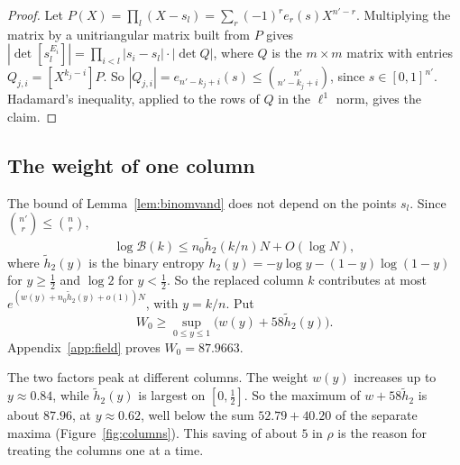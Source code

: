 \documentclass[11pt]{amsart}
\newcommand{\WZero}{87.9663}
\theoremstyle{definition}
\theoremstyle{remark}
\numberwithin{equation}{section}
\begin{document}
\begin{proof}
Let $P(X)=\prod_l(X-s_l)=\sum_r(-1)^re_r(s)X^{n'-r}$. Multiplying the matrix by a unitriangular matrix built
from $P$ gives $|\det[s_l^{E_i}]|=\prod_{i<l}|s_i-s_l|\cdot|\det Q|$, where $Q$ is the $m\times m$ matrix with
entries $Q_{j,i}=[X^{k_j-i}]P$. So $|Q_{j,i}|=e_{n'-k_j+i}(s)\le\binom{n'}{n'-k_j+i}$, since $s\in[0,1]^{n'}$.
Hadamard's inequality, applied to the rows of $Q$ in the $\ell^1$ norm, gives the claim.
\end{proof}

\subsection{The weight of one column}\label{ssec:weights}
The bound of Lemma~\ref{lem:binomvand} does not depend on the points $s_l$. Since $\binom{n'}r\le\binom nr$,
\[
 \log\mathcal B(k)\le n_0\tilde h_2(k/n)N+O(\log N),
\]
where $\tilde h_2(y)$ is the binary entropy $h_2(y)=-y\log y-(1-y)\log(1-y)$ for $y\ge\frac12$ and $\log2$ for
$y<\frac12$. So the replaced column $k$ contributes at most $e^{(w(y)+n_0\tilde h_2(y)+o(1))N}$, with $y=k/n$.
Put
\[
 W_0\ge\sup_{0\le y\le1}\bigl(w(y)+58\tilde h_2(y)\bigr).
\]
Appendix~\ref{app:field} proves $W_0=\WZero$.

The two factors peak at different columns. The weight $w(y)$ increases up to $y\approx0.84$, while
$\tilde h_2(y)$ is largest on $[0,\frac12]$. So the maximum of $w+58\tilde h_2$ is about $87.96$, at
$y\approx0.62$, well below the sum $52.79+40.20$ of the separate maxima (Figure~\ref{fig:columns}). This saving of
about $5$ in $\rho$ is the reason for treating the columns one at a time.
\end{document}
